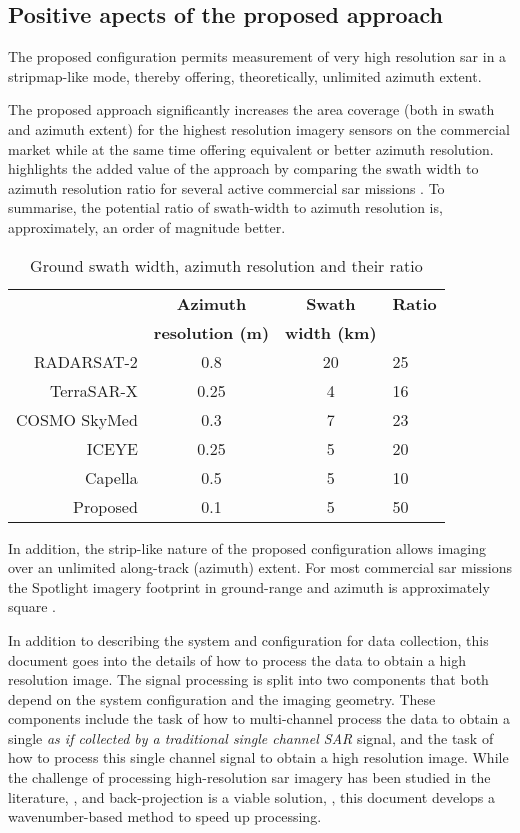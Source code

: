\subsection{Positive apects of the proposed approach}
The proposed configuration permits measurement of very high resolution \gls{sar} in a stripmap-like mode, thereby offering, theoretically, unlimited azimuth extent.
\par
The proposed approach significantly increases the area coverage (both in swath and azimuth extent) for the highest resolution imagery sensors on the commercial market while at the same time offering equivalent or better azimuth resolution.  highlights the added value of the approach by comparing the swath width to azimuth resolution ratio for several active commercial \gls{sar} missions \cite{Brautigam2010, Fox2004, Porfilio2016, Mittermayer}. To summarise, the potential ratio of swath-width to azimuth resolution is, approximately, an order of magnitude better. 
\begin{table}[h!]
 \begin{center}
 \caption{Ground swath width, azimuth resolution and their ratio}
  \begin{tabular}{r|c|c|l}
   & {\bf Azimuth} & {\bf Swath} & {\bf Ratio}\\
   & {\bf resolution (m)} & {\bf width (km)} & {}\\\hline
   RADARSAT-2 & 0.8 & 20 & 25\\\hline
   TerraSAR-X & 0.25 & 4 & 16\\\hline
   COSMO SkyMed & 0.3 & 7 & 23\\\hline
   ICEYE & 0.25 & 5 & 20\\\hline
   Capella & 0.5& 5 & 10\\\hline
   Proposed & 0.1 & 5 & 50
  \end{tabular}
  \label{tb:reswidth}
 \end{center}
\end{table}
In addition, the strip-like nature of the proposed configuration allows imaging over an unlimited along-track (azimuth) extent. For most commercial \gls{sar} missions the Spotlight imagery footprint in ground-range and azimuth is approximately square \cite{Mittermayer}. 
\par
In addition to describing the system and configuration for data collection, this document goes into the details of how to process the data to obtain a high resolution image. The signal processing is split into two components that both depend on the system configuration and the imaging geometry. These components include the task of how to multi-channel process the data to obtain a single {\em as if collected by a traditional single channel SAR} signal, and the task of how to process this single channel signal to obtain a high resolution image. While the challenge of processing high-resolution \gls{sar} imagery has been studied in the literature, \cite{Luo2014, Meng2018, Edelhust2017, Prats2014, Zhao2014, Wu2016}, and back-projection is a viable solution, \cite{RodriguezCassola2019}, this document develops a wavenumber-based method to speed up processing.
